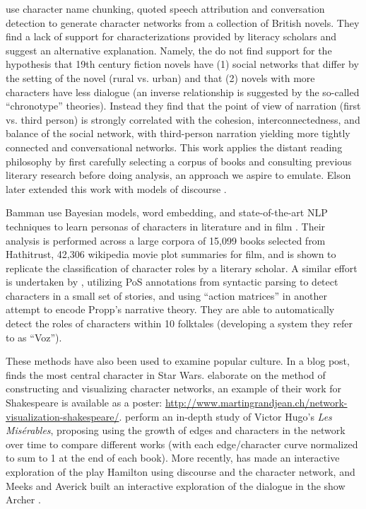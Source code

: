 {\cite{elson2010extracting} use character name chunking, quoted speech attribution and conversation detection to generate character networks from a collection of British novels.
They find a lack of support for characterizations provided by literacy scholars and suggest an alternative explanation.
Namely, the do not find support for the hypothesis that 19th century fiction novels have (1) social networks that differ by the setting of the novel (rural vs. urban) and that (2) novels with more characters have less dialogue (an inverse relationship is suggested by the so-called ``chronotype'' theories).
Instead they find that the point of view of narration (first vs. third person) is strongly correlated with the cohesion, interconnectedness, and balance of the social network, with third-person narration yielding more tightly connected and conversational networks.
This work applies the distant reading philosophy by first carefully selecting a corpus of books and consulting previous literary research before doing analysis, an approach we aspire to emulate.
Elson later extended this work with models of discourse \citep{elson2012modeling}.

Bamman \etal use Bayesian models, word embedding, and state-of-the-art NLP techniques to learn personas of characters in literature \citep{bamman2014bayesian} and in film \citep{bamman2014learning}.
Their analysis is performed across a large corpora of 15,099 books selected from Hathitrust, 42,306 wikipedia movie plot summaries for film, and is shown to replicate the classification of character roles by a literary scholar.
A similar effort is undertaken by \cite{valls2014toward}, utilizing PoS annotations from syntactic parsing to detect characters in a small set of stories, and using ``action matrices'' in another attempt \citep{valls2014toward2} to encode Propp's narrative theory.
They are able to automatically detect the roles of characters within 10 folktales (developing a system they refer to as ``Voz'').

These methods have also been used to examine popular culture.
In a blog post, \cite{gabasova2015star-blog} finds the most central character in Star Wars.
\cite{xanthos2016visualising} elaborate on the method of constructing and visualizing character networks, an example of their work for Shakespeare is available as a poster: \href{http://www.martingrandjean.ch/network-visualization-shakespeare/}{http://www.martingrandjean.ch/network-visualization-shakespeare/}.
\cite{min2016narrative} perform an in-depth study of Victor Hugo's \textit{Les Misérables}, proposing using the growth of edges and characters in the network over time to compare different works (with each edge/character curve normalized to sum to 1 at the end of each book).
More recently, \cite{wu2016interactive} has made an interactive exploration of the play Hamilton using discourse and the character network, and Meeks and Averick built an interactive exploration of the dialogue in the show Archer \citep{meeks2017data}.

}
